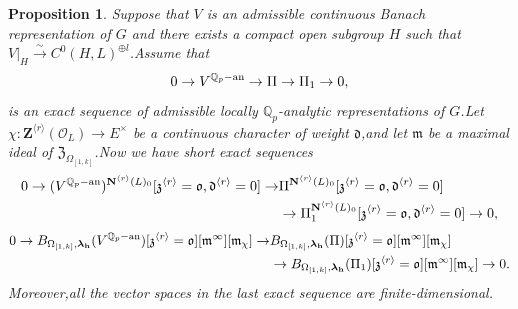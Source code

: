 \documentclass[SecEq,CM,GP]{degruyter-crelle} %
\theoremstyle{plain}
\newtheorem{pro}[thm]{Proposition}
\newcommand{\ana}{{\rm an}}
\newcommand{\lrr}{{\langle r\rangle}}
\newcommand{\omepik}{\Omega_{[1,k]}}
\newcommand{\BQ}{{\mathbb{Q}}}
\newcommand{\bN}{{\mathbf{N}}}
\newcommand{\bZ}{{\mathbf{Z}}}
\newcommand{\bh}{{\mathbf{h}}}
\newcommand{\cO}{\mathcal O}
\newcommand{\fd}{{\mathfrak{d}}}
\newcommand{\fm}{{\mathfrak{m}}}
\newcommand{\fo}{{\mathfrak{o}}}
\newcommand{\fz}{{\mathfrak{z}}}
\begin{document}
\begin{pro}\label{emertongenerpara}Suppose that $V$ is an admissible continuous Banach representation of $G$ and there exists a compact open subgroup $H$ such that $V|_H\xrightarrow{\sim}C^0(H,L)^{\oplus l}$.\;Assume that
\begin{equation}\label{exactanaylytic}
	0\rightarrow V^{\BQ_p-\ana}\rightarrow \Pi\rightarrow \Pi_1\rightarrow 0,
\end{equation}
is an exact sequence of admissible locally $\BQ_p$-analytic representations of $G$.\;Let $\chi:\bZ^{\lrr}(\cO_L)\rightarrow E^\times$ be a continuous character of weight $\fd$,\;and let $\fm$ be a maximal ideal of $\mathfrak{Z}_{\omepik}$.\;Now we have short exact sequences
\begin{equation}\label{techexactseq1}
	\begin{aligned}
		0\rightarrow (V^{\BQ_p-\ana})^{\bN^{\lrr}(L)_0}[\fz^{\lrr}=\fo,\fd^{\lrr}=0]\rightarrow& \Pi^{\bN^{\lrr}(L)_0}[\fz^{\lrr}=\fo,\fd^{\lrr}=0] \\
		&\rightarrow \Pi_1^{\bN^{\lrr}(L)_0}[\fz^{\lrr}=\fo,\fd^{\lrr}=0]\rightarrow 0,
	\end{aligned}
\end{equation}
\begin{equation}\label{techexactseq2}
	\begin{aligned}
		0\rightarrow B_{\omepik,{\bm\lambda}_\bh}(V^{\BQ_p-\ana})[\fz^{\lrr}=\fo][\fm^\infty][
		\fm_{\chi}]\rightarrow &B_{\omepik,{\bm\lambda}_\bh}(\Pi)[\fz^{\lrr}=\fo][\fm^\infty][
		\fm_{\chi}]\\
		&\rightarrow B_{\omepik,{\bm\lambda}_\bh}(\Pi_1)[\fz^{\lrr}=\fo][\fm^\infty][
		\fm_{\chi}]\rightarrow 0.
	\end{aligned}
\end{equation}
Moreover,\;all the vector spaces in the last exact sequence are finite-dimensional.\;
\end{pro}
\end{document}
